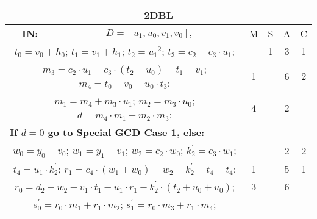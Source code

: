 \begin{tabular}{|c|cr|c|c|c|c|}
\hline
\multicolumn{7}{|c|}{\bf{2DBL}} \TS \\
\hline
\bf{IN:} &\multicolumn{2}{|c|}{$D = [u_1,u_0,v_1,v_0], $}
\TS & M & \hspace{1pt}S\hspace{1pt} & A & \hspace{1pt}C\hspace{1pt} \\
\hline
\multicolumn{3}{|R{340pt}|}{ 
$t_0=v_0+h_0$;\hspace{4pt}
$t_1=v_1+h_1$;\hspace{4pt}
$t_2=u_1{}^{2}$;\hspace{4pt}
$t_3=c_2-c_3 \cdot u_1$;\hspace{4pt}
} &  & 1 & 3 & 1\\
\multicolumn{3}{|R{340pt}|}{ 
$m_3=c_2 \cdot u_1-c_3 \cdot (t_2-u_0)-t_1-v_1$;\hspace{4pt}
$m_4=t_0+v_0-u_0 \cdot t_3$;\hspace{4pt}
} & 1 &  & 6 & 2\\
\multicolumn{3}{|R{340pt}|}{ 
$m_1=m_4+m_3 \cdot u_1$;\hspace{4pt}
$m_2=m_3 \cdot u_0$;\hspace{4pt}
$d=m_4 \cdot m_1-m_2 \cdot m_3$;\hspace{4pt}
} & 4 &  & 2 & \\
\multicolumn{3}{|l|}{ 
 \bf{If $d = 0$ go to Special GCD Case 1, else:} } &  &  &  & \\
\multicolumn{3}{|R{340pt}|}{ 
$w_0=y_0-v_0$;\hspace{4pt}
$w_1=y_1-v_1$;\hspace{4pt}
$w_2=c_2 \cdot w_0$;\hspace{4pt}
$k_2^{\prime}=c_3 \cdot w_1$;\hspace{4pt}
} &  &  & 2 & 2\\
\multicolumn{3}{|R{340pt}|}{ 
$t_4=u_1 \cdot k_2^{\prime}$;\hspace{4pt}
$r_1=c_4 \cdot (w_1+w_0)-w_2-k_2^{\prime}-t_4-t_4$;\hspace{4pt}
} & 1 &  & 5 & 1\\
\multicolumn{3}{|R{340pt}|}{ 
$r_0=d_2+w_2-v_1 \cdot t_1-u_1 \cdot r_1-k_2^{\prime} \cdot (t_2+u_0+u_0)$;\hspace{4pt}
} & 3 &  & 6 & \\
\multicolumn{3}{|R{340pt}|}{ 
$s^{\prime}_0=r_0 \cdot m_1+r_1 \cdot m_2$;\hspace{4pt}
$s^{\prime}_1=r_0 \cdot m_3+r_1 \cdot m_4$;\hspace{4pt}
}
\end{tabular}

